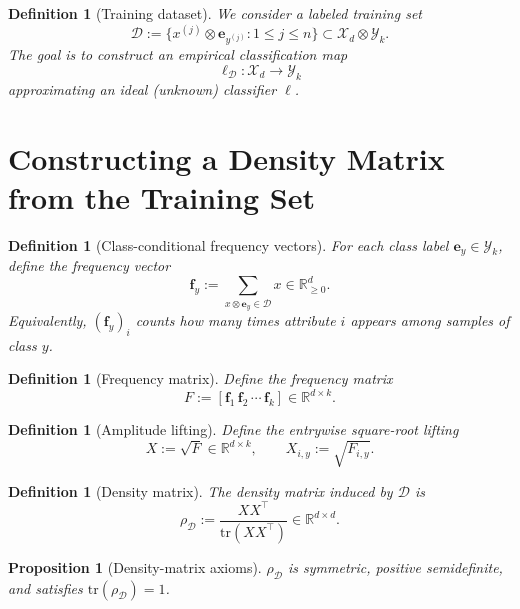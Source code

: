 \documentclass[preprint,11pt]{elsarticle}
\newtheorem{Definition}[Theorem]{Definition}
\newtheorem{Proposition}[Theorem]{Proposition}
\newcommand{\R}{\mathbb{R}}
\begin{document}
\begin{Definition}[Training dataset]
We consider a labeled training set
\[
\mathcal D := \{x^{(j)}\otimes \mathbf e_{y^{(j)}} : 1\le j\le n\}\subset \mathcal X_d\otimes\mathcal Y_k.
\]
The goal is to construct an empirical classification map
\[
\ell_{\mathcal D}:\mathcal X_d\to\mathcal Y_k
\]
approximating an ideal (unknown) classifier $\ell$.
\end{Definition}


\section{Constructing a Density Matrix from the Training Set}
\label{sec:density_construction}

\begin{Definition}[Class-conditional frequency vectors]
For each class label $\mathbf e_y\in\mathcal Y_k$, define the frequency vector
\[
\mathbf f_y := \sum_{x\otimes \mathbf e_y\in \mathcal D} x \in \R^d_{\ge 0}.
\]
Equivalently, $(\mathbf f_y)_i$ counts how many times attribute $i$ appears among samples of class $y$.
\end{Definition}

\begin{Definition}[Frequency matrix]
Define the frequency matrix
\[
F := [\mathbf f_1\,\mathbf f_2\,\cdots\,\mathbf f_k]\in\R^{d\times k}.
\]
\end{Definition}

\begin{Definition}[Amplitude lifting]
Define the entrywise square-root lifting
\[
X:=\sqrt{F}\in\R^{d\times k},\qquad X_{i,y}:=\sqrt{F_{i,y}}.
\]
\end{Definition}

\begin{Definition}[Density matrix]
\label{def:density_matrix}
The density matrix induced by $\mathcal D$ is
\[
\rho_{\mathcal D}:=\frac{XX^\top}{\mathrm{tr}(XX^\top)}\in\R^{d\times d}.
\]
\end{Definition}

\begin{Proposition}[Density-matrix axioms]
\label{prop:density_axioms}
$\rho_{\mathcal D}$ is symmetric, positive semidefinite, and satisfies $\mathrm{tr}(\rho_{\mathcal D})=1$.
\end{Proposition}
\end{document}
